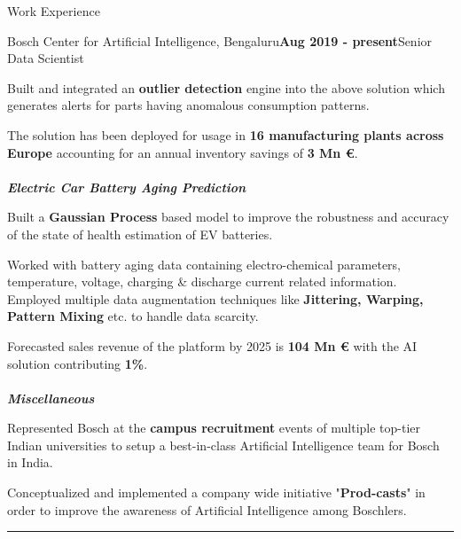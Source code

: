 \documentclass{resume}
\begin{document}
\begin{rSection}{Work Experience}
\begin{rSubsection}{\large Bosch Center for Artificial Intelligence, Bengaluru}{\textbf{\large Aug 2019 - present}}{\large Senior Data Scientist}{}
  \item Built and integrated an \textbf{outlier detection} engine into the above solution which generates alerts for parts having anomalous consumption patterns.
 \item The solution has been deployed for usage in \textbf{16 manufacturing plants across Europe} accounting for an annual inventory savings of \textbf{3 Mn \euro{}}.\\\\
{\textbf{\textit{Electric Car Battery Aging Prediction}}}
 \item Built a \textbf{Gaussian Process} based model to improve the robustness and accuracy of the state of health estimation of EV batteries. 
 \item Worked with battery aging data containing electro-chemical parameters, temperature, voltage, charging \& discharge current related information. Employed multiple data augmentation techniques like \textbf{Jittering, Warping, Pattern Mixing} etc. to handle data scarcity.
 \item Forecasted sales revenue of the platform by 2025 is \textbf{104 Mn \euro{}} with the AI solution contributing \textbf{1\%}.\\\\
{\textbf{\textit{Miscellaneous}}}
 \item Represented Bosch at the \textbf{campus recruitment} events of multiple top-tier Indian universities to setup a best-in-class Artificial Intelligence team for Bosch in India.
 \item Conceptualized and implemented a company wide initiative "\textbf{Prod-casts}" in order to improve the awareness of Artificial Intelligence among Boschlers.\\
 \noindent\rule{6.75in}{0.1pt}
\end{rSubsection}


\end{rSection}
\end{document}
